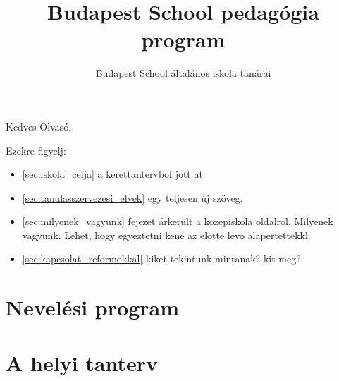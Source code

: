 \documentclass[magyar,12pt,a4paper,draft]{report}
\begin{document}
\newif\ifkerettanterv
\kerettantervfalse

\title{Budapest School pedagógia program}
\author{Budapest School általános iskola tanárai}
\maketitle

Kedves Olvasó,

Ezekre figyelj:
\begin{itemize}
  \item \ref{sec:iskola_celja} a kerettantervbol jott at
\item \ref{sec:tanulasszervezesi_elvek} egy teljesen új szöveg.
\item \ref{sec:milyenek_vagyunk} fejezet árkerült a kozepiskola oldalrol. Milyenek vagyunk. Lehet, hogy egyeztetni kene az elotte levo alapertettekkl.
\item \ref{sec:kapcsolat_reformokkal} kiket tekintunk mintanak? kit meg?
\end{itemize}

\listoftodos[Notes]

\tableofcontents
\newpage
\part{Nevelési program}


\part{A helyi tanterv}



{}
\label{sec:bibliographyk}

\end{document}
